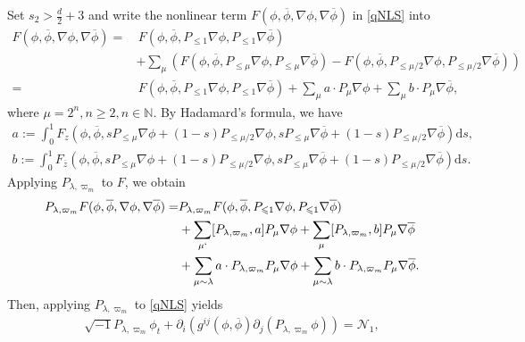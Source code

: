 \documentclass[10pt,twoside,a4paper]{article}
\numberwithin{equation}{section}\allowdisplaybreaks
\def\leq{\leqslant}
\def\geq{\geqslant}
\begin{document}
Set $ s_2 >\frac{d}{2}+3$   and write the nonlinear term $ F(\phi, \overline{\phi}, \nabla \phi, \nabla \overline{\phi}) $ in \eqref{qNLS} into
\begin{align*}
	F(\phi, \overline{\phi}, \nabla \phi, \nabla \overline{\phi})=  &\,F(\phi, \overline{\phi}, P_{\leq 1} \nabla \phi,  P_{\leq 1} \nabla \overline{\phi})\\
	&+\sum_{ \mu}  \left(F(\phi, \overline{\phi}, P_{\leq \mu} \nabla \phi,  P_{\leq \mu}  \nabla \overline{\phi})-F(\phi, \overline{\phi}, P_{\leq  \mu/2} \nabla \phi,  P_{\leq  \mu/2}  \nabla \overline{\phi})\right)\\
	=&\, F(\phi, \overline{\phi}, P_{\leq 1} \nabla \phi,  P_{\leq 1} \nabla \overline{\phi})+\sum_{\mu} a \cdot P_\mu \nabla \phi + \sum_{\mu} b\cdot P_\mu \nabla\overline{ \phi },
\end{align*}
where $ \mu=2^n, n\geq 2, n \in \mathbb{N} $. By Hadamard's formula, we have
\begin{align} 
	a:= \int_0^1   F_z (\phi, \overline{ \phi }, s  P_{\leq  \mu}  \nabla \phi +(1-s) P_{\leq  \mu/2}  \nabla \phi,  s  P_{\leq  \mu}  \nabla \overline{\phi}+(1-s) P_{\leq  \mu/2}  \nabla \overline{\phi}) \mathrm{d} s,\label{a}\\
	b:= \int_0^1  F_{\overline{z}} (\phi, \overline{ \phi }, s  P_{\leq  \mu}  \nabla \phi +(1-s) P_{\leq  \mu/2}  \nabla \phi,  s  P_{\leq  \mu}  \nabla \overline{\phi}+(1-s) P_{\leq  \mu/2}  \nabla \overline{\phi}) \mathrm{d} s. \label{b}
\end{align}
Applying $ P_{\lambda, \varpi_m}   $ to $ F $, we obtain
\begin{align*}
	P_{\lambda, \varpi_m}   F(\phi, \overline{\phi}, \nabla \phi, \nabla \overline{\phi})=  &  P_{\lambda, \varpi_m}  F(\phi, \overline{\phi}, P_{\leq 1} \nabla \phi,  P_{\leq 1} \nabla \overline{\phi}) \\
	&+ \sum_{\mu` } [  P_{\lambda, \varpi_m},a  ]  P_\mu \nabla \phi + \sum_{\mu }  [P_{\lambda, \varpi_m},b ]  P_\mu \nabla\overline{ \phi }\\
	&+\sum_{\mu\sim \lambda} a \cdot  P_{\lambda, \varpi_m}   P_\mu \nabla \phi + \sum_{\mu\sim \lambda} b\cdot  P_{\lambda, \varpi_m}   P_\mu \nabla\overline{ \phi }.
\end{align*}
Then,
applying $  P_{\lambda, \varpi_m}   $ to \eqref{qNLS}  yields
\begin{align} \label{PqNLS}
	\sqrt{-1}  P_{\lambda, \varpi_m} \phi_t+\partial_i\left( g^{ij}\left(\phi,\overline{\phi}\right)   \partial_j (P_{\lambda, \varpi_m} \phi)\right)=\mathcal{N}_1,
\end{align}
\end{document}
